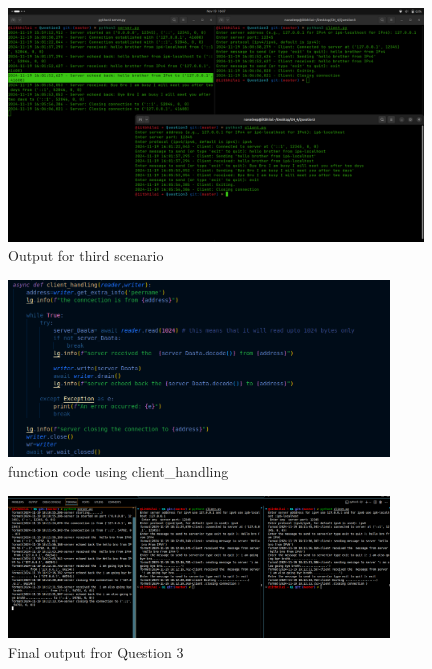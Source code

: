 \documentclass{exam}
\begin{document}
\begin{figure}[H]
    \centering
    \includegraphics[width=0.98\textwidth]{3rd_Output.png} %
    \caption{Output for third scenario}
    \label{fig:output2}
\end{figure}


\newpage

\begin{figure}[H]
    \centering
    \includegraphics[width=0.9\textwidth]{Q3_clienthandling_server.png} %
    \caption{function code using client\_handling}
    \label{fig:output2}
\end{figure}

\begin{figure}[H]
    \centering
    \includegraphics[width=0.9\textwidth]{Q3finaloutput.png } 
    \caption{Final output  fror Question 3 }
    \label{fig:output1}
\end{figure}
\end{document}
